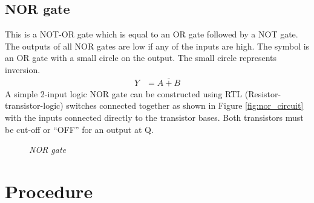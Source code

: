 	\subsection{NOR gate}
		This is a NOT-OR gate which is equal to an OR gate followed by a NOT gate. The outputs of all NOR gates are low if any of the inputs are high. The symbol is an OR gate with a small circle on the output. The small circle represents inversion.
		\begin{align*}
			Y &= \overline{A + B}
		\end{align*}		
		A simple 2-input logic NOR gate can be constructed using RTL (Resistor-transistor-logic) switches connected together as shown in Figure \ref{fig:nor_circuit} with the inputs connected directly to the transistor bases. Both transistors must be cut-off or “OFF” for an output at Q.
		\begin{figure}[ht]
			\centering 
			\hfill
			\hfill
			\caption{\textit{NOR gate}}
		\end{figure}
		
\section{Procedure}
